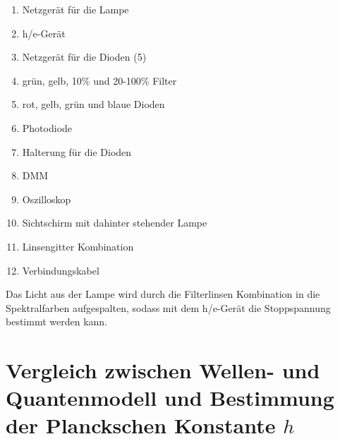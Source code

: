 \documentclass[12px]{scrartcl}
\begin{document}
\begin{enumerate}
\item	Netzgerät für die Lampe

\item	h/e-Gerät

\item	Netzgerät für die Dioden (5)

\item	grün, gelb, 10\% und 20-100\% Filter

\item	rot, gelb, grün und blaue Dioden

\item	Photodiode

\item	Halterung für die Dioden

\item	DMM

\item	Oszilloskop

\item	Sichtschirm mit dahinter stehender Lampe

\item	Linsengitter Kombination

\item	Verbindungskabel
\end{enumerate}

Das Licht aus der Lampe wird durch die Filterlinsen Kombination in die Spektralfarben aufgespalten, sodass mit dem h/e-Gerät die Stoppspannung bestimmt werden kann.


\section{Vergleich zwischen Wellen- und Quantenmodell und Bestimmung der Planckschen
Konstante $h$}
\end{document}
